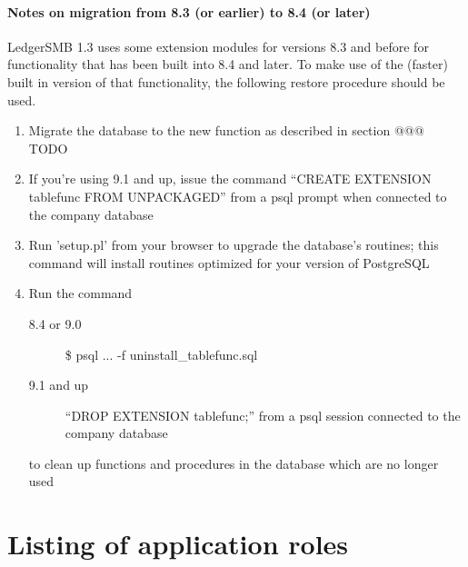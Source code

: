 
\subsubsection{Notes on migration from 8.3 (or earlier) to 8.4 (or later)}



LedgerSMB 1.3 uses some extension modules for versions 8.3 and before for functionality
that has been built into 8.4 and later. To make use of the (faster) built in version
of that functionality, the following restore procedure should be used.

\begin{enumerate}
\item Migrate the database to the new function as described in section @@@ TODO
\item If you're using 9.1 and up, issue the command ``CREATE EXTENSION tablefunc FROM UNPACKAGED''
   from a psql prompt when connected to the company database
\item Run 'setup.pl' from your browser to upgrade the database's routines; this command will
   install routines optimized for your version of PostgreSQL
\item Run the command
	\begin{description}
	\item [8.4 or 9.0] \$ psql ... -f uninstall\_tablefunc.sql
	\item [9.1 and up] ``DROP EXTENSION tablefunc;'' from a psql session connected
		to the company database
	\end{description}
	to clean up functions and procedures in the database which are no longer used
\end{enumerate}


\chapter{Listing of application roles}
\label{cha:RolesListing}

